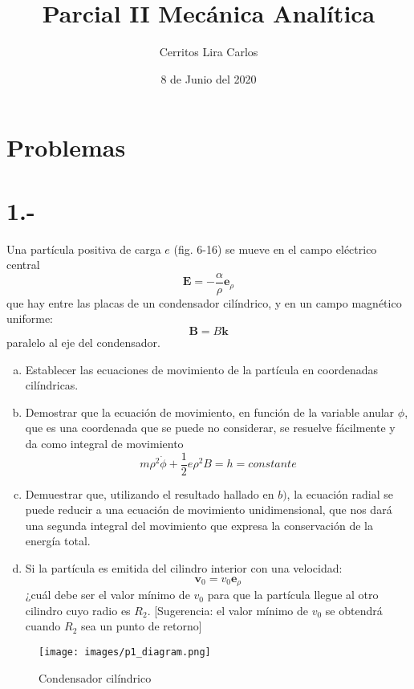 \documentclass{article}
\title{Parcial II Mecánica Analítica}
\author{Cerritos Lira Carlos}
\date{8 de Junio del 2020}
\begin{document}
\maketitle
\section*{Problemas}
\section*{1.-}
Una partícula positiva de carga $e$ (fig. 6-16) se mueve en el campo eléctrico central
\[ \bm{E} = -\frac{\alpha}{\rho} \bm{e}_{\rho} \]
que hay entre las placas de un condensador cilíndrico, y en un campo magnético uniforme:
\[ \bm{B} = B\bm{k} \]
paralelo al eje del condensador.
\begin{enumerate}[a)]
    \item Establecer las ecuaciones de movimiento de la partícula en coordenadas cilíndricas.
    \item Demostrar que la ecuación de movimiento, en función de la variable anular $\phi$, que es 
    una coordenada que se puede no considerar, se resuelve fácilmente y da como integral de movimiento 
    \[ m\rho^2\dot{\phi} + \frac{1}{2}e\rho^2B = h = constante \]
    \item Demuestrar que, utilizando el resultado hallado en $b)$, la ecuación radial se puede 
    reducir a una ecuación de movimiento unidimensional, que nos dará una segunda integral del movimiento 
    que expresa la conservación de la energía total. 
    \item Si la partícula es emitida del cilindro interior con una velocidad:
    \[ \bm{v}_0 = v_0\bm{e}_\rho \]
    ¿cuál debe ser el valor mínimo de $v_0$ para que la partícula llegue al otro cilindro cuyo radio es $R_2$.
    [Sugerencia: el valor mínimo de $v_0$ se obtendrá cuando $R_2$ sea un punto de retorno]
\end{enumerate}
\begin{figure}[H]
    \centering
    \texttt{[image: images/p1\_diagram.png]}
    \caption{Condensador cilíndrico}
\end{figure}
\end{document}
